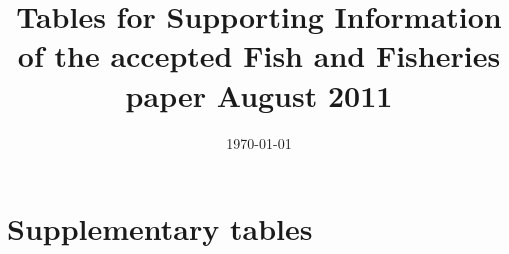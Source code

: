 \documentclass[letterpaper,review,authoryear,12pt]{article}
\title{Tables for Supporting Information of the accepted Fish and Fisheries paper August 2011}
\date{\today}
\begin{document}
\renewcommand{\figurename}{Fig. S}
\renewcommand{\tablename}{Table S}

\maketitle
\section{Supplementary tables}

\begin{landscape}
\begin{tiny}

\end{tiny}
\end{landscape}



\end{document}
